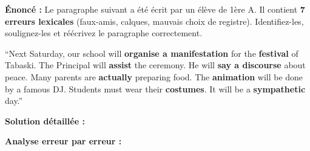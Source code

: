 \documentclass[11pt]{article}
\begin{document}
\begin{exoresolu}
\textbf{Énoncé :} Le paragraphe suivant a été écrit par un élève de 1ère A. Il contient \textbf{7 erreurs lexicales} (faux-amis, calques, mauvais choix de registre). Identifiez-les, soulignez-les et réécrivez le paragraphe correctement.

\begin{textebox}
``Next Saturday, our school will \textbf{organise a manifestation} for the \textbf{festival} of Tabaski. The Principal will \textbf{assist} the ceremony. He will \textbf{say a discourse} about peace. Many parents are \textbf{actually} preparing food. The \textbf{animation} will be done by a famous DJ. Students must wear their \textbf{costumes}. It will be a \textbf{sympathetic} day.''
\end{textebox}

\tcblower
\textbf{Solution détaillée :}

\textbf{Analyse erreur par erreur :}


\end{exoresolu}
\end{document}
